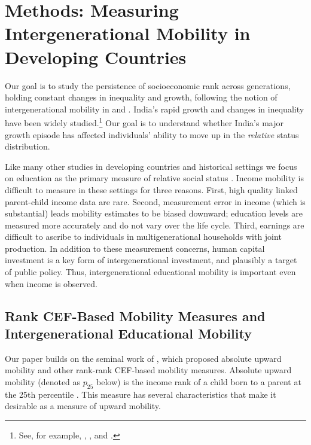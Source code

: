 \documentclass[12pt,letterpaper]{article}
\numberwithin{equation}{section}
\begin{document}
\section{Methods: Measuring Intergenerational Mobility in Developing Countries}
\label{sec:method}

Our goal is to study the persistence of socioeconomic rank across generations, holding constant changes in inequality and growth, following the notion of intergenerational mobility in  and . India's rapid growth and changes in inequality have been widely studied.\footnote{See, for example, , , and .}  Our goal is to understand whether India's major growth episode has affected individuals' ability to move up in the \textit{relative} status distribution.

Like many other studies in developing countries and historical settings we focus on education as the primary measure of relative social status \cite{solon1999,guell2013,wantchekon2015a,card2022,derenoncourt2022,alesina2018}. Income mobility is difficult to measure in these settings for three reasons. First, high quality linked parent-child income data are rare. Second, measurement error in income (which is substantial) leads mobility estimates to be biased downward; education levels are measured more accurately and do not vary over the life cycle. Third, earnings are difficult to ascribe to individuals in multigenerational households with joint production. In addition to these measurement concerns, human capital investment is a key form of intergenerational investment, and plausibly a target of public policy. Thus, intergenerational educational mobility is important even when income is observed.

\subsection{Rank CEF-Based Mobility Measures and Intergenerational Educational Mobility}
\label{sec:method_bg}

Our paper builds on the seminal work of , which proposed absolute upward mobility and other rank-rank CEF-based mobility measures. Absolute upward mobility (denoted as $p_{25}$ below) is the income rank of a child born to a parent at the 25th percentile \cite{chetty2014c}. This measure has several characteristics that make it desirable as a measure of upward mobility.
\end{document}
